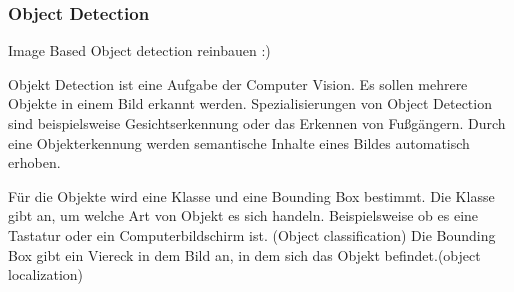 %
%
%
%
%

%
%
%
%




\subsubsection{Object Detection}
Image Based Object detection reinbauen :)

Objekt Detection ist eine Aufgabe der Computer Vision. Es sollen mehrere Objekte in einem Bild erkannt werden. Spezialisierungen von Object Detection sind beispielsweise Gesichtserkennung oder das Erkennen von Fußgängern. Durch eine Objekterkennung werden semantische Inhalte eines Bildes automatisch erhoben. 

Für die Objekte wird eine Klasse und eine Bounding Box bestimmt. 
Die Klasse gibt an, um welche Art von Objekt es sich handeln. Beispielsweise ob es eine Tastatur oder ein Computerbildschirm ist. (Object classification)
Die Bounding Box gibt ein Viereck in dem Bild an, in dem sich das Objekt befindet.(object localization)

